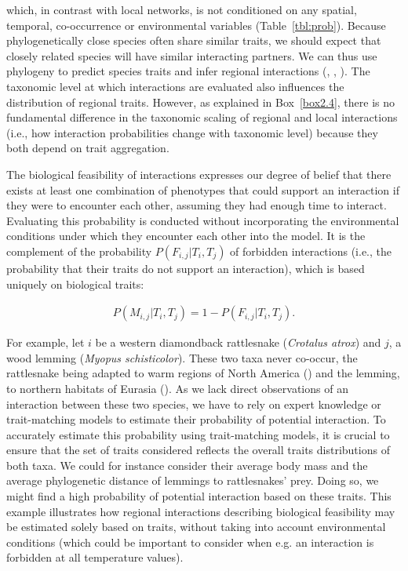 which, in contrast with local networks, is not conditioned on any spatial,
temporal, co-occurrence or environmental variables (Table~\ref{tbl:prob}).
Because phylogenetically close species often share similar traits, we should
expect that closely related species will have similar interacting partners. We
can thus use phylogeny to predict species traits and infer regional interactions
(\cite{Strydom2022Food}, \cite{Eklof2016Phylogenetic},
\cite{Stouffer2012Evolutionary}). The taxonomic level at which interactions are
evaluated also influences the distribution of regional traits. However, as
explained in Box~\ref{box2.4}, there is no fundamental difference in the taxonomic scaling
of regional and local interactions (i.e., how interaction probabilities change
with taxonomic level) because they both depend on trait aggregation. 

The biological feasibility of interactions expresses our degree of belief that
there exists at least one combination of phenotypes that could support an
interaction if they were to encounter each other, assuming they had enough time
to interact. Evaluating this probability is conducted without incorporating the
environmental conditions under which they encounter each other into the model.
It is the complement of the probability $P(F_{i, j} | T_i, T_j)$ of forbidden
interactions (i.e., the probability that their traits do not support an
interaction), which is based uniquely on biological traits:

\begin{eqnarray}
  \label{eq:forbidden}
  P(M_{i, j} | T_i, T_j) = 1 - P(F_{i, j} | T_i, T_j).
\end{eqnarray}

For example, let $i$ be a western diamondback rattlesnake (\textit{Crotalus
atrox}) and $j$, a wood lemming (\textit{Myopus schisticolor}). These two taxa
never co-occur, the rattlesnake being adapted to warm regions of North America
(\cite{Castoe2007Phylogeographic}) and the lemming, to northern habitats of
Eurasia (\cite{Fedorov2008Comparative}). As we lack direct observations of an
interaction between these two species, we have to rely on expert knowledge or
trait-matching models to estimate their probability of potential interaction. To
accurately estimate this probability using trait-matching models, it is crucial
to ensure that the set of traits considered reflects the overall traits
distributions of both taxa. We could for instance consider their average body
mass and the average phylogenetic distance of lemmings to rattlesnakes' prey.
Doing so, we might find a high probability of potential interaction based on
these traits. This example illustrates how regional interactions describing
biological feasibility may be estimated solely based on traits, without taking
into account environmental conditions (which could be important to consider when
e.g. an interaction is forbidden at all temperature values). 

